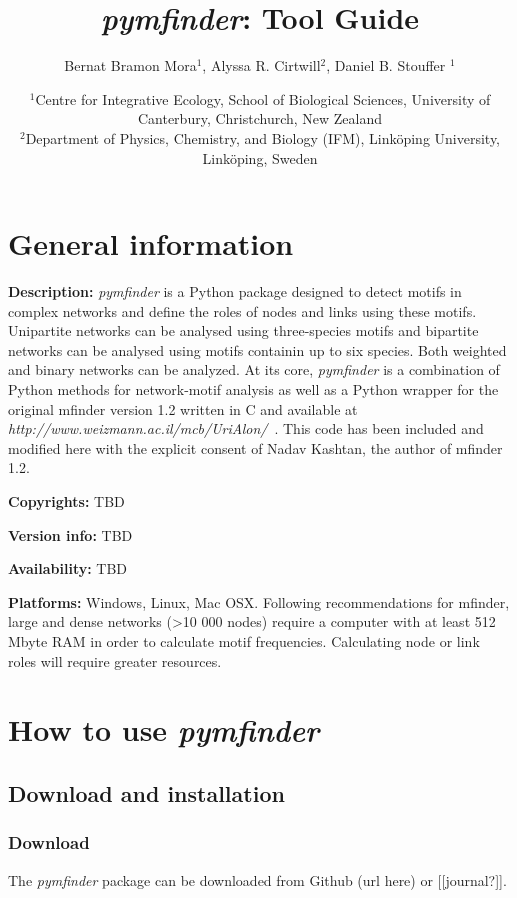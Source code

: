 \documentclass[12pt]{article}
\title{\emph{pymfinder}: Tool Guide}
\author{Bernat Bramon Mora$^{1}$, Alyssa R. Cirtwill$^{2}$, Daniel B. Stouffer $^{1}$}
\date{\small
$^1$Centre for Integrative Ecology, School of Biological Sciences, University of Canterbury, Christchurch, New Zealand\\
\medskip
$^2$Department of Physics, Chemistry, and Biology (IFM), Link\"{o}ping University, Link\"{o}ping, Sweden\\ }
\begin{document}
 
\maketitle 
\raggedright
\setlength{\parindent}{15pt} 

\newpage



\section{General information}

	\textbf{Description:} \textit{pymfinder} is a Python package designed to detect motifs in complex networks and define the roles of nodes and links using these motifs. Unipartite networks can be analysed using three-species motifs and bipartite networks can be analysed using motifs containin up to six species. Both weighted and binary networks can be analyzed. At its core, \emph{pymfinder} is a combination of Python methods for network-motif analysis as well as a Python wrapper for the original mfinder version 1.2 written in C and available at \emph{http://www.weizmann.ac.il/mcb/UriAlon/}~\citep{Alonwebsite}. This code has been included and modified here with the explicit consent of Nadav Kashtan, the author of mfinder 1.2.

	\textbf{Copyrights:} TBD

	\textbf{Version info:} TBD

	\textbf{Availability:} TBD

	\textbf{Platforms:} Windows, Linux, Mac OSX. Following recommendations for mfinder, large and dense networks (\textgreater10 000 nodes) require a computer with at least 512 Mbyte RAM in order to calculate motif frequencies. Calculating node or link roles will require greater resources.


\section{How to use \emph{pymfinder}}

	\subsection{Download and installation}

		\subsubsection{Download}

			The \emph{pymfinder} package can be downloaded from Github (url here) or [[journal?]].
\end{document}
